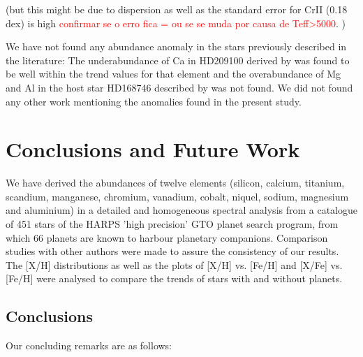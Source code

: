 \documentclass[dvips,12pt,a4paper]{report}
\begin{document}
{{ (but this might be due to dispersion as well as the standard error for CrII (0.18 dex) is high \textcolor{red}{confirmar se o erro fica = ou se se muda por causa de Teff>5000}. )

We have not found any abundance anomaly in the stars previously described in the literature: The underabundance of Ca in HD209100 derived by \citet{Bodaghee-2003} was found to be well within the trend values for that element and the overabundance of Mg and Al in the host star HD168746 described by \citet{Gilli-2006} was not found. We did not found any other work mentioning the anomalies found in the present study.

\chapter{Conclusions and Future Work}

We have derived the abundances of twelve elements (silicon, calcium, titanium, scandium, manganese, chromium, vanadium, cobalt, niquel, sodium, magnesium and aluminium) in a detailed and homogeneous spectral analysis from a catalogue of 451 stars of the HARPS 'high precision' GTO planet search program, from which 66 planets are known to harbour planetary companions. Comparison studies with other authors were made to assure the consistency of our results. The [X/H] distributions as well as the plots of [X/H] vs. [Fe/H] and [X/Fe] vs. [Fe/H] were analysed to compare the trends of stars with and without planets. 


\section {Conclusions}

Our concluding remarks are as follows:

\begin{itemize}
 

\end{itemize}}}
\end{document}
